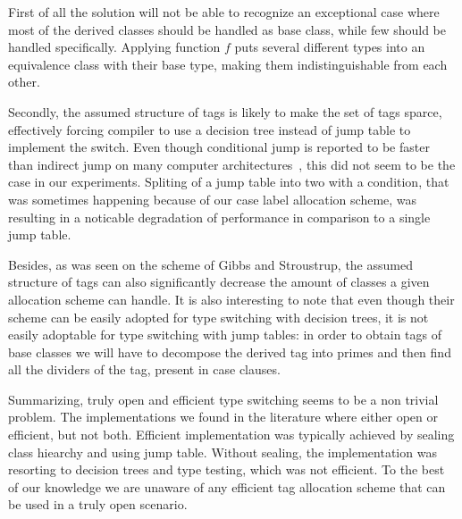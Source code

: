 \documentclass[preprint]{sigplanconf}
\begin{document}
First of all the solution will not be able to recognize an exceptional case 
where most of the derived classes should be handled as base class, while few 
should be handled specifically. Applying function $f$ puts several different 
types into an equivalence class with their base type, making them 
indistinguishable from each other.

Secondly, the assumed structure of tags is likely to make the set of tags 
sparce, effectively forcing compiler to use a decision tree instead of jump 
table to implement the switch. Even though conditional jump is reported to be 
faster than indirect jump on many computer architectures~\cite[]{garrigue-98}, this did not seem to be the case in our experiments. Spliting 
of a jump table into two with a condition, that was sometimes happening because 
of our case label allocation scheme, was resulting in a noticable degradation of 
performance in comparison to a single jump table.

Besides, as was seen on the scheme of Gibbs and Stroustrup, the assumed 
structure of tags can also significantly decrease the amount of classes a given 
allocation scheme can handle. It is also interesting to note that even though 
their scheme can be easily adopted for type switching with decision trees, it is 
not easily adoptable for type switching with jump tables: in order to obtain 
tags of base classes we will have to decompose the derived tag into primes and 
then find all the dividers of the tag, present in case clauses.

Summarizing, truly open and efficient type switching seems to be a non trivial 
problem. The implementations we found in the literature where either open or 
efficient, but not both. Efficient implementation was typically achieved by 
sealing class hiearchy and using jump table. Without sealing, the implementation 
was resorting to decision trees and type testing, which was not efficient.
To the best of our knowledge we are unaware of any efficient tag allocation 
scheme that can be used in a truly open scenario.


%
\end{document}
